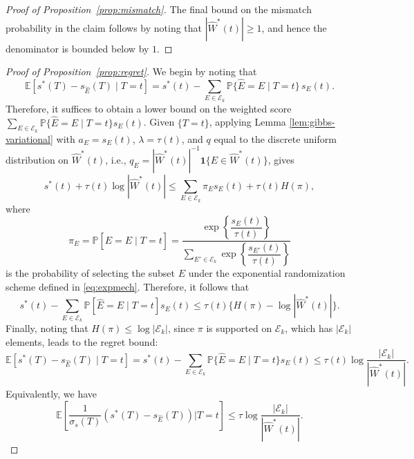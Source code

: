 \documentclass[12pt]{article}
\newcommand{\Pp}{{\mathbb{P}}}
\newcommand{\Ee}{{\mathbb{E}}}
\newcommand{\Ek}{\mathcal{E}_{k}}      %
\newcommand{\Ehat}{\widehat{E}}
\newcommand{\Estar}{\widehat{W}^*}
\newcommand{\snoise}{\sigma_{s}}
\begin{document}
\begin{appendices}
\begin{proof}[Proof of Proposition~\ref{prop:mismatch}]
The final bound on the mismatch probability in the claim follows by noting that $|\Estar(t)|\ge 1$, and hence the denominator is bounded below by $1$.
\end{proof}


\begin{proof}[Proof of Proposition~\ref{prop:regret}]
We begin by noting that
\[
  \Ee\!\left[s^*(T)-s_{\Ehat}(T)\mid T=t\right]
  =
  s^*(t)
  -
  \sum_{E\in\Ek}
  \Pp\{\Ehat=E\mid T=t\}\,s_E(t).
\]
Therefore, it suffices to obtain a lower bound on the weighted score
$\sum_{E\in\Ek}\Pp\{\Ehat=E\mid T=t\}s_E(t)$. Given $\{T=t\}$, applying Lemma \ref{lem:gibbs-variational} with $a_E=s_E(t)$, $\lambda=\tau(t)$, and $q$ equal to the discrete uniform distribution on $\Estar(t)$, i.e.,
$q_E=|\Estar(t)|^{-1}\mathbf{1}\{E\in\Estar(t)\}$,
gives
\[
  s^*(t)+\tau(t)\log |\Estar(t)| \leq \sum_{E\in\Ek}
  \pi_E s_E(t)
  +
  \tau(t) H(\pi),
\]
where 
$$\pi_E=\Pp\left[\Ehat=E\mid T=t\right] = \dfrac{\exp\!\left\{\dfrac{s_E(t)}{\tau(t)}\right\}}
       {\displaystyle\sum_{E' \in \Ek}
        \exp\!\left\{\dfrac{s_{E'}(t)}{\tau(t)}\right\}}$$
is the probability of selecting the subset $E$ under the exponential randomization scheme defined in \eqref{eq:expmech}. Therefore, it follows that
\[
  s^*(t)
  -
  \sum_{E\in\Ek}
  \Pp\left[\Ehat=E\mid T=t\right]s_E(t)
  \le
  \tau(t)\{H(\pi)-\log |\Estar(t)|\}.
\]
Finally, noting that $H(\pi)\le \log |\Ek|$, since $\pi$ is supported on $\Ek$, which has $|\Ek|$ elements, leads to the regret bound:
\[
  \Ee\!\left[s^*(T)-s_{\Ehat}(T)\mid T=t\right]
  =
  s^*(t)
  -
  \sum_{E\in\Ek}
  \Pp\{\Ehat=E\mid T=t\}s_E(t)
  \le
  \tau(t)\log\frac{|\Ek|}{|\Estar(t)|}.
\]
Equivalently, we have
\[
  \Ee\!\left[\frac{1}{\snoise(T)}(s^*(T)-s_{\Ehat}(T))\Big\lvert T=t\right]\le
  \tau\log\frac{|\Ek|}{|\Estar(t)|}.
\]
\end{proof}




\end{appendices}
\end{document}
